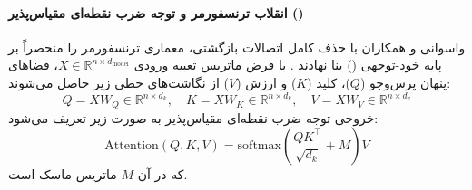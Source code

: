 \paragraph*{انقلاب ترنسفورمر و توجه ضرب نقطه‌ای مقیاس‌پذیر ()}
واسوانی و همکاران \cite{vaswani2017attention} با حذف کامل اتصالات بازگشتی، معماری ترنسفورمر را منحصراً بر پایه خود-توجهی () بنا نهادند \cite{hosseinzadeh2025attention, serret2026understanding}. با فرض ماتریس تعبیه ورودی $X \in \mathbb{R}^{n \times d_{\text{model}}}$، فضاهای پنهان پرس‌وجو ($Q$)، کلید ($K$) و ارزش ($V$) از نگاشت‌های خطی زیر حاصل می‌شوند:
\begin{equation}
    Q = X W_Q \in \mathbb{R}^{n \times d_k}, \quad K = X W_K \in \mathbb{R}^{n \times d_k}, \quad V = X W_V \in \mathbb{R}^{n \times d_v}
\end{equation}
خروجی توجه ضرب نقطه‌ای مقیاس‌پذیر به صورت زیر تعریف می‌شود:
\begin{equation}
    \text{Attention}(Q, K, V) = \text{softmax}\left(\frac{Q K^\top}{\sqrt{d_k}} + M\right) V
\end{equation}
که در آن $M$ ماتریس ماسک است.

